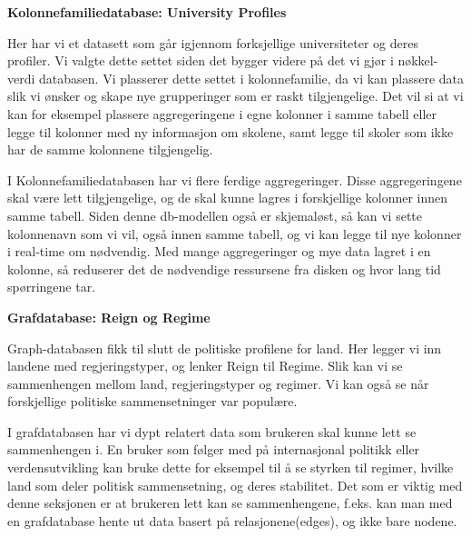 \textbf{Kolonnefamiliedatabase: University Profiles}

Her har vi et datasett som går igjennom forksjellige universiteter og deres profiler. Vi valgte dette settet siden det bygger videre på det vi gjør i nøkkel-verdi databasen. 
Vi plasserer dette settet i kolonnefamilie, da vi kan plassere data slik vi ønsker og skape nye grupperinger som er raskt tilgjengelige. Det vil si at vi kan for eksempel plassere aggregeringene i egne kolonner i samme tabell eller legge til kolonner med ny informasjon om skolene, samt legge til skoler som ikke har de samme kolonnene tilgjengelig.

I Kolonnefamiliedatabasen har vi flere ferdige aggregeringer. Disse aggregeringene skal være lett tilgjengelige, og de skal kunne lagres i forskjellige kolonner innen samme tabell. Siden denne db-modellen også er skjemaløst, så kan vi sette kolonnenavn som vi vil, også innen samme tabell, og vi kan legge til nye kolonner i real-time om nødvendig. Med mange aggregeringer og mye data lagret i en kolonne, så reduserer det de nødvendige ressursene fra disken og hvor lang tid spørringene tar.


\textbf{Grafdatabase: Reign og Regime}

Graph-databasen fikk til slutt de politiske profilene for land. Her legger vi inn landene med regjeringstyper, og lenker Reign til Regime. Slik kan vi se sammenhengen mellom land, regjeringstyper og regimer. Vi kan også se når forskjellige politiske sammensetninger var populære. 

I grafdatabasen har vi dypt relatert data som brukeren skal kunne lett se sammenhengen i. En bruker som følger med på internasjonal politikk eller verdensutvikling kan bruke dette for eksempel til å se styrken til regimer, hvilke land som deler politisk sammensetning, og deres stabilitet. Det som er viktig med denne seksjonen er at brukeren lett kan se sammenhengene, f.eks. kan man med en grafdatabase hente ut data basert på relasjonene(edges), og ikke bare nodene.